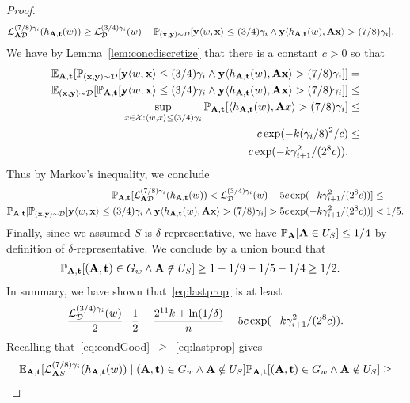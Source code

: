 \begin{proof}
\begin{align*}
    \mathcal{L}_{\mathbf{A} \mathcal{D}}^{(7/8)\gamma_i}(h_{\mathbf{A},\mathbf{t}}(w)) &\geq \mathcal{L}_{\mathcal{D}}^{(3/4)\gamma_i}(w) - \mathbb{P}_{(\mathbf{x}, \mathbf{y})\sim \mathcal{D}}[\mathbf{y} \langle w, \mathbf{x} \rangle \leq (3/4)\gamma_i \wedge \mathbf{y} \langle h_{\mathbf{A},\mathbf{t}}(w), \mathbf{A} \mathbf{x} \rangle > (7/8)\gamma_i].
\end{align*}
We have by Lemma~\ref{lem:concdiscretize} that there is a constant $c>0$ so that
\begin{align*}
    \mathbb{E}_{\mathbf{A},\mathbf{t}}[\mathbb{P}_{(\mathbf{x}, \mathbf{y})\sim \mathcal{D}}[\mathbf{y} \langle w, \mathbf{x} \rangle \leq (3/4)\gamma_i \wedge \mathbf{y} \langle h_{\mathbf{A},\mathbf{t}}(w), \mathbf{A} \mathbf{x} \rangle > (7/8)\gamma_i]] &= \\
    \mathbb{E}_{(\mathbf{x}, \mathbf{y})\sim \mathcal{D}}[\mathbb{P}_{\mathbf{A},\mathbf{t}}[\mathbf{y} \langle w, \mathbf{x} \rangle \leq (3/4)\gamma_i \wedge \mathbf{y} \langle h_{\mathbf{A},\mathbf{t}}(w), \mathbf{A} \mathbf{x} \rangle > (7/8)\gamma_i]] &\leq \\
    \sup_{x \in \mathcal{X} : \langle w, x\rangle \leq (3/4)\gamma_i}\mathbb{P}_{\mathbf{A},\mathbf{t}}[ \langle h_{\mathbf{A},\mathbf{t}}(w), \mathbf{A} x \rangle > (7/8)\gamma_i] &\leq \\
    c\exp(-k(\gamma_i/8)^2/c) &\leq \\
    c\exp(-k \gamma_{i+1}^2/(2^{8}c)).
\end{align*}
Thus by Markov's inequality, we conclude
\begin{align*}
\mathbb{P}_{\mathbf{A},\mathbf{t}}[\mathcal{L}_{\mathbf{A} \mathcal{D}}^{(7/8)\gamma_i}(h_{\mathbf{A},\mathbf{t}}(w)) <\mathcal{L}_{\mathcal{D}}^{(3/4)\gamma_i}(w)- 5c \exp(-k \gamma_{i+1}^2/(2^{8}c))] &\leq \\
    \mathbb{P}_{\mathbf{A},\mathbf{t}}[\mathbb{P}_{(\mathbf{x}, \mathbf{y})\sim \mathcal{D}}[\mathbf{y} \langle w, \mathbf{x} \rangle \leq (3/4)\gamma_i \wedge \mathbf{y} \langle h_{\mathbf{A},\mathbf{t}}(w), \mathbf{A} \mathbf{x} \rangle > (7/8)\gamma_i] > 5 c \exp(-k \gamma_{i+1}^2/(2^{8}c))] &< 1/5.
\end{align*}
Finally, since we assumed $S$ is $\delta$-representative, we have $\mathbb{P}_{\mathbf{A}}[\mathbf{A} \in U_S] \leq 1/4$ by definition of $\delta$-representative. We conclude by a union bound that
\begin{align*}
\mathbb{P}_{\mathbf{A},\mathbf{t}}[(\mathbf{A},\mathbf{t})\in G_w \wedge \mathbf{A} \notin U_S] &\geq 1-1/9-1/5-1/4\geq 1/2.
\end{align*}
In summary, we have shown that~\eqref{eq:lastprop} is at least
\[
\frac{\mathcal{L}_{ \mathcal{D}}^{(3/4)\gamma_i}(w)}{2} \cdot \frac{1}{2} - \frac{2^{11} k + \ln(1/\delta)}{n} -5 c \exp(-k \gamma_{i+1}^2/(2^{8}c)).
\]
Recalling that~\eqref{eq:condGood}~$\geq$~\eqref{eq:lastprop} gives
\begin{align*}
\E_{\rA,\rt}[\Loss^{(7/8)\gamma_i}_{\rA S}(h_{\rA,\rt}(w)) \mid (\rA,\rt) \in G_w \wedge \rA \notin U_S] \Pr_{\rA,\rt}[(\rA,\rt) \in G_w \wedge \rA \notin U_S] &\geq \\

\end{align*}
\end{proof}
